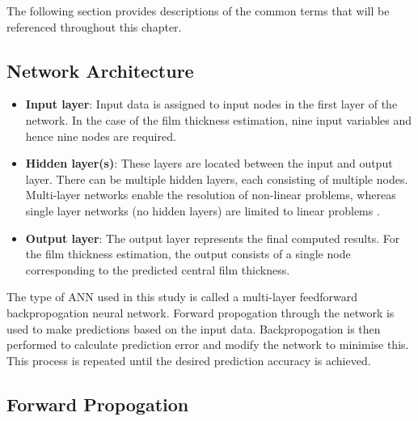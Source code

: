 The following section provides descriptions of the common terms that will be referenced throughout this chapter.

\subsection{Network Architecture}
\begin{itemize}
	\item \textbf{Input layer}: Input data is assigned to input nodes in the first layer of the network. In the case of the film thickness estimation, nine input variables and hence nine nodes are required.
	\item \textbf{Hidden layer(s)}: These layers are located between the input and output layer. There can be multiple hidden layers, each consisting of multiple nodes. Multi-layer networks enable the resolution of non-linear problems, whereas single layer networks (no hidden layers) are limited to linear problems \cite{Bell2014}.
	\item \textbf{Output layer}: The output layer represents the final computed results. For the film thickness estimation, the output consists of a single node corresponding to the predicted central film thickness.
\end{itemize}

The type of ANN used in this study is called a multi-layer feedforward backpropogation neural network. Forward propogation through the network is used to make predictions based on the input data. Backpropogation is then performed to calculate prediction error and modify the network to minimise this. This process is repeated until the desired prediction accuracy is achieved.

\subsection{Forward Propogation}

